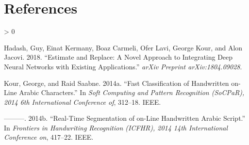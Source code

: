 \documentclass{article}
\newlength{\cslhangindent}
\newenvironment{CSLReferences}[2] %
 {%
  \setlength{\parindent}{0pt}
  \ifodd #1 \everypar{\setlength{\hangindent}{\cslhangindent}}\ignorespaces\fi
  \ifnum #2 > 0
  \setlength{\parskip}{#2\baselineskip}
  \fi
 }%
 {}
\begin{document}
\hypertarget{references}{%
\section*{References}\label{references}}

\hypertarget{refs}{}
\begin{CSLReferences}{1}{0}
\leavevmode\hypertarget{ref-hadash2018estimate}{}%
Hadash, Guy, Einat Kermany, Boaz Carmeli, Ofer Lavi, George Kour, and Alon Jacovi. 2018. {``Estimate and Replace: A Novel Approach to Integrating Deep Neural Networks with Existing Applications.''} \emph{arXiv Preprint arXiv:1804.09028}.

\leavevmode\hypertarget{ref-kour2014fast}{}%
Kour, George, and Raid Saabne. 2014a. {``Fast Classification of Handwritten on-Line Arabic Characters.''} In \emph{Soft Computing and Pattern Recognition (SoCPaR), 2014 6th International Conference of}, 312--18. IEEE.

\leavevmode\hypertarget{ref-kour2014real}{}%
---------. 2014b. {``Real-Time Segmentation of on-Line Handwritten Arabic Script.''} In \emph{Frontiers in Handwriting Recognition (ICFHR), 2014 14th International Conference on}, 417--22. IEEE.

\end{CSLReferences}



\end{document}
